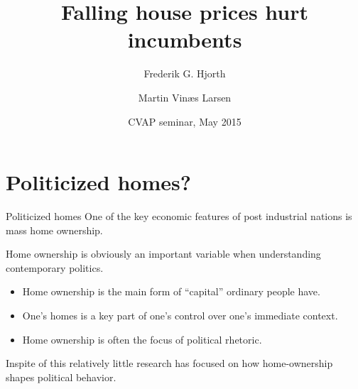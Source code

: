 \documentclass[aspectratio=169]{beamer}
\title[Power and responsibility]{Falling house prices hurt incumbents}
\author{Frederik G. Hjorth \and Martin Vinæs Larsen}
\institute[UCPH]{\large{Department of Political Science \\ University of Copenhagen}}
\date[May 2015]{CVAP seminar, May 2015}
\begin{document}
	
	\begin{frame}
		\titlepage
	\end{frame}
	
	
\section{Politicized homes?}

	\begin{frame}{Politicized homes}
	One of the key economic features of post industrial nations is mass home ownership.
	
	\vspace{0.2in}
	
	Home ownership is obviously an important variable when understanding contemporary politics.
	\begin{itemize}
		\item Home ownership is the main form of ``capital'' ordinary people have.
		\item One's homes is a key part of one's control over one's immediate context.
		\item Home ownership is often the  focus of political rhetoric.
	\end{itemize}
	
		\vspace{0.2in}
		
	Inspite of this relatively little research has focused on how home-ownership shapes political behavior.
		\end{frame}	
	
\end{document}
